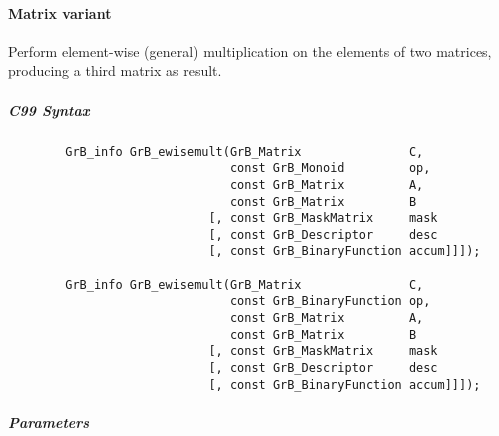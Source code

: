 \paragraph{Matrix variant}

Perform element-wise (general) multiplication on the elements of two matrices,
producing a third matrix as result.



\subparagraph{C99 Syntax}

\begin{verbatim}
        GrB_info GrB_ewisemult(GrB_Matrix               C,
                               const GrB_Monoid         op, 
                               const GrB_Matrix         A,
                               const GrB_Matrix         B
                            [, const GrB_MaskMatrix     mask
                            [, const GrB_Descriptor     desc
                            [, const GrB_BinaryFunction accum]]]);
                            
        GrB_info GrB_ewisemult(GrB_Matrix               C,
                               const GrB_BinaryFunction op, 
                               const GrB_Matrix         A,
                               const GrB_Matrix         B
                            [, const GrB_MaskMatrix     mask
                            [, const GrB_Descriptor     desc
                            [, const GrB_BinaryFunction accum]]]);
\end{verbatim}

\subparagraph{Parameters}

